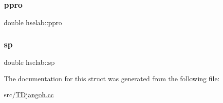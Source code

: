 \mbox{\label{structhselab_af756f7122657e3414cf16a37c43b2783}} 
\subsubsection{\texorpdfstring{ppro}{ppro}}
{\footnotesize\ttfamily double hselab\+::ppro}

\mbox{\label{structhselab_ab0c3f6d0a07afa7b5e019ebd7d08b34f}} 
\subsubsection{\texorpdfstring{sp}{sp}}
{\footnotesize\ttfamily double hselab\+::sp}



The documentation for this struct was generated from the following file\+:\begin{DoxyCompactItemize}
\item 
src/\hyperlink{_t_djangoh_8cc}{T\+Djangoh.\+cc}\end{DoxyCompactItemize}
